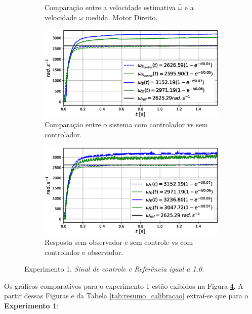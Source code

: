 \begin{figure}[H]
\begin{subfigure}{.5\textwidth}
    \caption{Comparação entre a velocidade estimativa $\hat{\omega}$ e a velocidade $\omega$ medida. Motor Direito.}
    \label{fig:exp01:filtragem_direito}
    \end{subfigure}
    \hfill
    \begin{subfigure}{.5\textwidth}
    \centering
    \includegraphics[width=\textwidth]{figuras/resultados/exp01/controlador_vs_sem_controlador100.eps}
    \caption{Comparação entre o sistema com controlador vs sem controlador.}
    \label{fig:exp01:controle}
    \end{subfigure}
    \hfill
    \begin{subfigure}{.5\textwidth}
    \centering
    \includegraphics[width=\textwidth]{figuras/resultados/exp01/antes_vs_depois100.eps}
    \caption{Resposta sem observador e sem controle vs com controlador e observador.}
    \label{fig:exp01:antes_vs_depois}
    \end{subfigure}
    
    \caption{Experimento 1. \emph{Sinal de controle e Referência igual a 1.0.}}
    \label{fig:exp01_100}
\end{figure}


Os gráficos comparativos para o experimento 1 estão exibidos na Figura \ref{fig:exp01_100}. A partir dessas Figuras e da Tabela \ref{tab:resumo_calibracao} extraí-se que para o \textbf{Experimento 1}:

